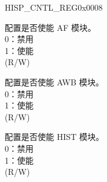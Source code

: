 \begin{register}{H}{ISP\_CNTL\_REG}{0x0008}
\begin{regdesc}
\begin{reglist}
\label{fielddesc:ISPAFEN}\item [ISP\_AF\_EN] 配置是否使能 AF 模块。\\0：禁用\\1：使能\\(R/W)
\label{fielddesc:ISPAWBEN}\item [ISP\_AWB\_EN] 配置是否使能 AWB 模块。\\0：禁用\\1：使能\\(R/W)
\label{fielddesc:ISPHISTEN}\item [ISP\_HIST\_EN] 配置是否使能 HIST 模块。\\0：禁用\\1：使能\\(R/W)
\item [见下页...]
\end{reglist}\end{regdesc}
\end{register}

